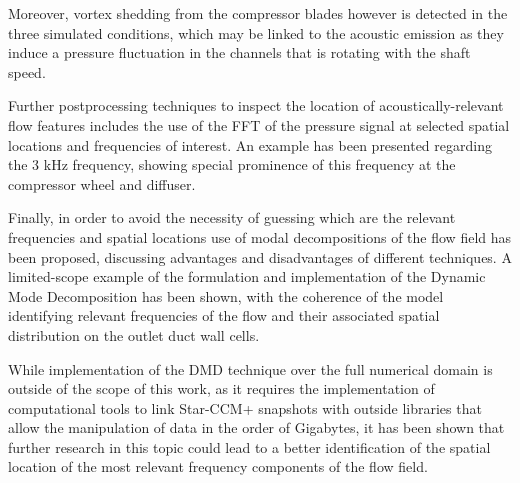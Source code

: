Moreover, vortex shedding from the compressor blades however is detected in the three simulated conditions, which may be linked to the acoustic emission as they induce a pressure fluctuation in the channels that is rotating with the shaft speed.

Further postprocessing techniques to inspect the location of acoustically-relevant flow features includes the use of the FFT of the pressure signal at selected spatial locations and frequencies of interest. An example has been presented regarding the 3 kHz frequency, showing special prominence of this frequency at the compressor wheel and diffuser.

Finally, in order to avoid the necessity of guessing which are the relevant frequencies and spatial locations use of modal decompositions of the flow field has been proposed, discussing advantages and disadvantages of different techniques. A limited-scope example of the formulation and implementation of the Dynamic Mode Decomposition has been shown, with the coherence of the model identifying relevant frequencies of the flow and their associated spatial distribution on the outlet duct wall cells.

While implementation of the DMD technique over the full numerical domain is outside of the scope of this work, as it requires the implementation of computational tools to link Star-CCM+ snapshots with outside libraries that allow the manipulation of data in the order of Gigabytes, it has been shown that further research in this topic could lead to a better identification of the spatial location of the most relevant frequency components of the flow field.




